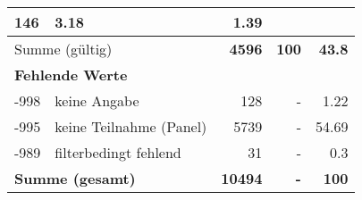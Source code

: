 \begin{longtable}{lXrrr}
       \num{146} &
       \num[round-mode=places,round-precision=2]{3.18} &
         \num[round-mode=places,round-precision=2]{1.39} \\
     \midrule
     \multicolumn{2}{l}{Summe (gültig)} &
       \textbf{\num{4596}} &
     \textbf{\num{100}} &
       \textbf{\num[round-mode=places,round-precision=2]{43.8}} \\
     \multicolumn{5}{l}{\textbf{Fehlende Werte}}\\
       -998 &
       keine Angabe &
         \num{128} &
        - &
         \num[round-mode=places,round-precision=2]{1.22} \\
       -995 &
       keine Teilnahme (Panel) &
         \num{5739} &
        - &
         \num[round-mode=places,round-precision=2]{54.69} \\
       -989 &
       filterbedingt fehlend &
         \num{31} &
        - &
         \num[round-mode=places,round-precision=2]{0.3} \\
     \midrule
     \multicolumn{2}{l}{\textbf{Summe (gesamt)}} &
          \textbf{\num{10494}} &
        \textbf{-} &
        \textbf{\num{100}} \\
     \bottomrule
     \end{longtable}
     
